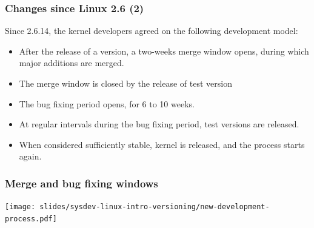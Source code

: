 \begin{frame}
  \frametitle{Changes since Linux 2.6 (2)}
  Since 2.6.14, the kernel developers agreed on the following
  development model:
  \begin{itemize}
  \item After the release of a  version, a two-weeks merge
    window opens, during which major additions are merged.
  \item The merge window is closed by the release of test version
  \item The bug fixing period opens, for 6 to 10 weeks.
  \item At regular intervals during the bug fixing period,
     test versions are released.
  \item When considered sufficiently stable, kernel 
    is released, and the process starts again.
  \end{itemize}
\end{frame}

\begin{frame}
  \frametitle{Merge and bug fixing windows}
  \begin{center}
    \texttt{[image: slides/sysdev-linux-intro-versioning/new-development-process.pdf]}
  \end{center}
\end{frame}

